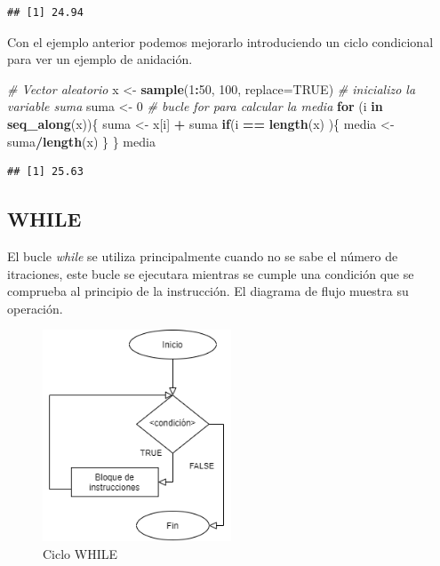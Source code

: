 \documentclass[11pt,]{article}
\newenvironment{Shaded}{\begin{snugshade}}{\end{snugshade}}
\newcommand{\CommentTok}[1]{\textcolor[rgb]{0.56,0.35,0.01}{\textit{#1}}}
\newcommand{\ControlFlowTok}[1]{\textcolor[rgb]{0.13,0.29,0.53}{\textbf{#1}}}
\newcommand{\DataTypeTok}[1]{\textcolor[rgb]{0.13,0.29,0.53}{#1}}
\newcommand{\DecValTok}[1]{\textcolor[rgb]{0.00,0.00,0.81}{#1}}
\newcommand{\KeywordTok}[1]{\textcolor[rgb]{0.13,0.29,0.53}{\textbf{#1}}}
\newcommand{\NormalTok}[1]{#1}
\newcommand{\OperatorTok}[1]{\textcolor[rgb]{0.81,0.36,0.00}{\textbf{#1}}}
\newcommand{\OtherTok}[1]{\textcolor[rgb]{0.56,0.35,0.01}{#1}}
\newcommand{\StringTok}[1]{\textcolor[rgb]{0.31,0.60,0.02}{#1}}
\begin{document}
\begin{verbatim}
## [1] 24.94
\end{verbatim}

Con el ejemplo anterior podemos mejorarlo introduciendo un ciclo
condicional para ver un ejemplo de anidación.

\begin{Shaded}
\begin{Highlighting}[]
\CommentTok{# Vector aleatorio}
\NormalTok{x <-}\StringTok{ }\KeywordTok{sample}\NormalTok{(}\DecValTok{1}\OperatorTok{:}\DecValTok{50}\NormalTok{, }\DecValTok{100}\NormalTok{, }\DataTypeTok{replace=}\OtherTok{TRUE}\NormalTok{)}
\CommentTok{# inicializo la variable suma}
\NormalTok{suma <-}\StringTok{ }\DecValTok{0}
\CommentTok{# bucle for para calcular la media}
\ControlFlowTok{for}\NormalTok{ (i }\ControlFlowTok{in} \KeywordTok{seq_along}\NormalTok{(x))\{}
\NormalTok{  suma <-}\StringTok{ }\NormalTok{x[i] }\OperatorTok{+}\StringTok{ }\NormalTok{suma}
  \ControlFlowTok{if}\NormalTok{(i }\OperatorTok{==}\StringTok{ }\KeywordTok{length}\NormalTok{(x) )\{}
\NormalTok{    media <-}\StringTok{ }\NormalTok{suma}\OperatorTok{/}\KeywordTok{length}\NormalTok{(x)}
\NormalTok{  \}}
\NormalTok{\}}
\NormalTok{media}
\end{Highlighting}
\end{Shaded}

\begin{verbatim}
## [1] 25.63
\end{verbatim}

\hypertarget{while}{%
\subsection{WHILE}\label{while}}

El bucle \emph{while} se utiliza principalmente cuando no se sabe el
número de itraciones, este bucle se ejecutara mientras se cumple una
condición que se comprueba al principio de la instrucción. El diagrama
de flujo muestra su operación.

\begin{figure}
\hypertarget{id}{%
\centering
\includegraphics[width=0.5\textwidth,height=0.3\textheight]{../schemas/WHILE.png}
\caption{Ciclo WHILE}\label{id}
}
\end{figure}
\end{document}
